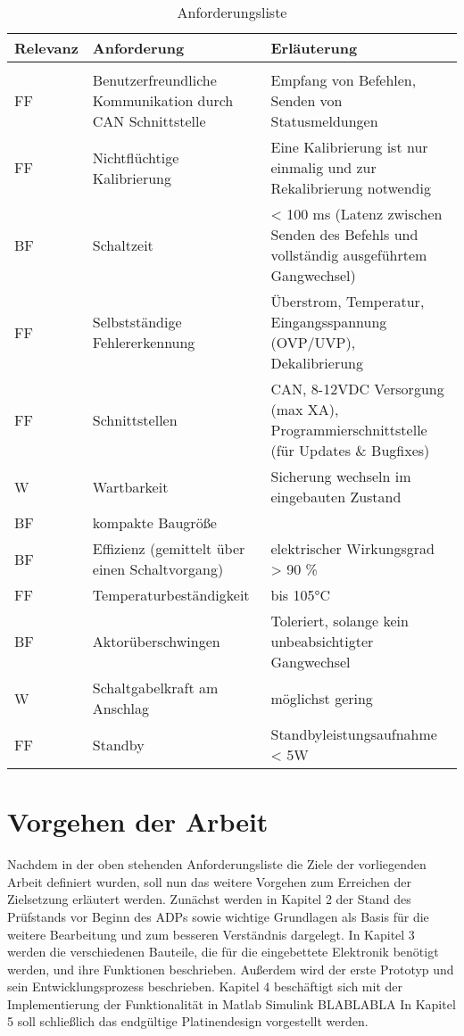 \begin{table}[h]
	\centering
		\begin{tabular}{l|p{7cm}|p{7cm}}
			\textbf{Relevanz} & \textbf{Anforderung} & \textbf{Erläuterung} \\ \hline
			& &\\
			FF & Benutzerfreundliche Kommunikation durch CAN Schnittstelle & Empfang von Befehlen, Senden von Statusmeldungen \\
			FF & Nichtflüchtige Kalibrierung & Eine Kalibrierung ist nur einmalig und zur Rekalibrierung notwendig \\
			BF & Schaltzeit & < 100 ms (Latenz zwischen Senden des Befehls und vollständig ausgeführtem Gangwechsel) \\
			FF & Selbstständige Fehlererkennung & Überstrom, Temperatur, Eingangsspannung (OVP/UVP), Dekalibrierung \\
			FF & Schnittstellen & CAN, 8-12VDC Versorgung (max XA), Programmierschnittstelle (für Updates \& Bugfixes) \\
			W & Wartbarkeit & Sicherung wechseln im eingebauten Zustand \\
			BF & kompakte Baugröße & \\
			BF & Effizienz (gemittelt über einen Schaltvorgang) & elektrischer Wirkungsgrad > 90 \% \\
			FF & Temperaturbeständigkeit & bis 105°C \\
			BF & Aktorüberschwingen & Toleriert, solange kein unbeabsichtigter Gangwechsel \\
			W & Schaltgabelkraft am Anschlag & möglichst gering \\
			FF & Standby & Standbyleistungsaufnahme < 5W \\
		\end{tabular}
	\caption{Anforderungsliste}
	\label{tab:Anforderungsliste}
\end{table}

\section{Vorgehen der Arbeit}
Nachdem in der oben stehenden Anforderungsliste die Ziele der vorliegenden Arbeit definiert wurden, soll nun das weitere Vorgehen zum Erreichen der Zielsetzung erläutert werden. Zunächst werden in Kapitel 2 der Stand des Prüfstands vor Beginn des ADPs sowie wichtige Grundlagen als Basis für die weitere Bearbeitung und zum besseren Verständnis dargelegt. In Kapitel 3 werden die verschiedenen Bauteile, die für die eingebettete Elektronik benötigt werden, und ihre Funktionen beschrieben. Außerdem wird der erste Prototyp und sein Entwicklungsprozess beschrieben. Kapitel 4 beschäftigt sich mit der Implementierung der Funktionalität in Matlab Simulink BLABLABLA
In Kapitel 5 soll schließlich das endgültige Platinendesign vorgestellt werden.